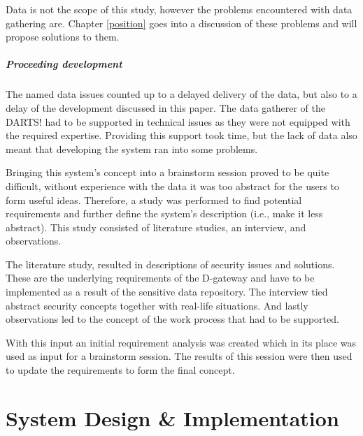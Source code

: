 \documentclass[a4paper]{report}
\newcommand{\ie}{i.e.,}
\newcommand{\project}{DARTS!}
\newcommand{\ivfsystem}{D-gateway}
\begin{document}
	Data is not the scope of this study, however the problems encountered with data gathering are.
	Chapter \ref{position} goes into a discussion of these problems and will propose solutions to them.
	
	\paragraph{Proceeding development}
	The named data issues counted up to a delayed delivery of the data, but also to a delay of the development discussed in this paper.
	The data gatherer of the \project{} had to be supported in technical issues as they were not equipped with the required expertise.
	Providing this support took time, but the lack of data also meant that developing the system ran into some problems.
	
	Bringing this system's concept into a brainstorm session proved to be quite difficult, without experience with the data it was too abstract for the users to form useful ideas.
	Therefore, a study was performed to find potential requirements and further define the system's description (\ie{} make it less abstract).
	This study consisted of literature studies, an interview, and observations.
	
	The literature study, resulted in descriptions of security issues and solutions.
	These are the underlying requirements of the \ivfsystem{} and have to be implemented as a result of the sensitive data repository.
	The interview tied abstract security concepts together with real-life situations.
	And lastly observations led to the concept of the work process that had to be supported. 
	
	With this input an initial requirement analysis was created which in its place was used as input for a brainstorm session.
	The results of this session were then used to update the requirements to form the final concept.
	
	
	
	
	
	
	
	
	
	
	
	\chapter{System Design \& Implementation}
	\label{system-functionality}
	
\end{document}
